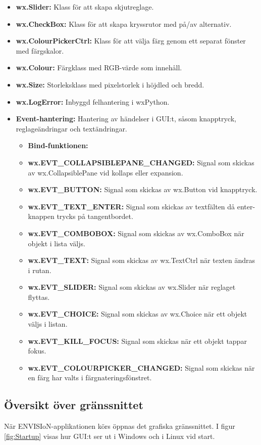 \begin{itemize}
    \item \textbf{wx.Slider: }Klass för att skapa skjutreglage.
    \item \textbf{wx.CheckBox: }Klass för att skapa kryssrutor med på/av alternativ.
    \item \textbf{wx.ColourPickerCtrl: }Klass för att välja färg genom ett separat fönster med färgskalor.
    \item \textbf{wx.Colour: }Färgklass med RGB-värde som innehåll.
    \item \textbf{wx.Size: }Storleksklass med pixelstorlek i höjdled och bredd.
    \item \textbf{wx.LogError: }Inbyggd felhantering i wxPython.
    \item \textbf{Event-hantering: }Hantering av händelser i GUI:t, såsom knapptryck, reglageändringar och textändringar.
    \begin{itemize}
        \setlength\itemsep{0em}
        \item \textbf{Bind-funktionen: }
        \item \textbf{wx.EVT\_COLLAPSIBLEPANE\_CHANGED: }Signal som skickas av wx.CollapsiblePane vid kollaps eller expansion.
        \item \textbf{wx.EVT\_BUTTON: }Signal som skickas av wx.Button vid knapptryck.
        \item \textbf{wx.EVT\_TEXT\_ENTER: }Signal som skickas av textfälten då enter-knappen trycks på tangentbordet.
        \item \textbf{wx.EVT\_COMBOBOX: }Signal som skickas av wx.ComboBox när objekt i lista väljs.
        \item \textbf{wx.EVT\_TEXT: }Signal som skickas av wx.TextCtrl när texten ändras i rutan.
        \item \textbf{wx.EVT\_SLIDER: }Signal som skickas av wx.Slider när reglaget flyttas.
        \item \textbf{wx.EVT\_CHOICE: }Signal som skickas av wx.Choice när ett objekt väljs i listan.
        \item \textbf{wx.EVT\_KILL\_FOCUS: }Signal som skickas när ett objekt tappar fokus.
        \item \textbf{wx.EVT\_COLOURPICKER\_CHANGED: }Signal som skickas när en färg har valts i färgnateringsfönstret.
    \end{itemize}
\end{itemize}


\subsection{Översikt över gränssnittet}
När ENVISIoN-applikationen körs öppnas det grafiska gränssnittet. I figur \ref{fig:Startup} visas hur GUI:t ser ut i Windows och i Linux vid start.

